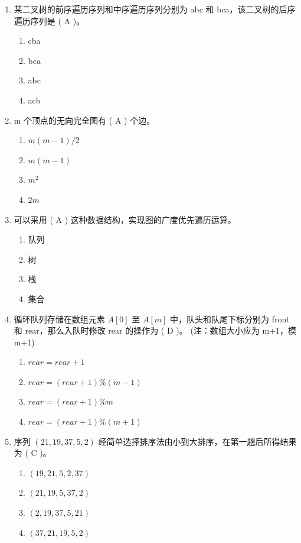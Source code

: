\documentclass[12pt, a4paper]{article}
\begin{document}
\begin{enumerate}[label=\arabic*.]
    \item 某二叉树的前序遍历序列和中序遍历序列分别为 abc 和 bca，该二叉树的后序遍历序列是 ( A )。
    \begin{enumerate}
        \item cba
        \item bca
        \item abc
        \item acb
    \end{enumerate}

    \item m 个顶点的无向完全图有 ( A ) 个边。
    \begin{enumerate}
        \item $m(m-1)/2$
        \item $m(m-1)$
        \item $m^2$
        \item $2m$
    \end{enumerate}

    \item 可以采用 ( A ) 这种数据结构，实现图的广度优先遍历运算。
    \begin{enumerate}
        \item 队列
        \item 树
        \item 栈
        \item 集合
    \end{enumerate}

    \item 循环队列存储在数组元素 $A[0]$ 至 $A[m]$ 中，队头和队尾下标分别为 front 和 rear，那么入队时修改 rear 的操作为 ( D )。 (注：数组大小应为 m+1，模 m+1)
    \begin{enumerate}
        \item $rear = rear + 1$
        \item $rear = (rear + 1) \% (m-1)$
        \item $rear = (rear + 1) \% m$
        \item $rear = (rear + 1) \% (m+1)$
    \end{enumerate}

    \item 序列 $(21, 19, 37, 5, 2)$ 经简单选择排序法由小到大排序，在第一趟后所得结果为 ( C )。
    \begin{enumerate}
        \item $(19, 21, 5, 2, 37)$
        \item $(21, 19, 5, 37, 2)$
        \item $(2, 19, 37, 5, 21)$ 
        \item $(37, 21, 19, 5, 2)$
    \end{enumerate}


\end{enumerate}
\end{document}
